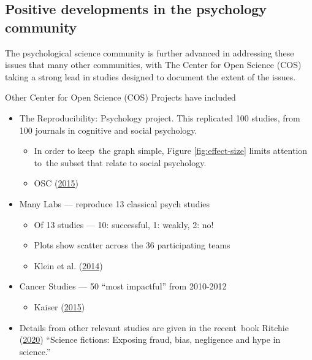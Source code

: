 \documentclass[
  10pt,
  b5paper]{book}
\providecommand{\tightlist}{%
  \setlength{\itemsep}{0pt}\setlength{\parskip}{0pt}}
\begin{document}
\hypertarget{positive-developments-in-the-psychology-community}{%
\subsection*{Positive developments in the psychology community}\label{positive-developments-in-the-psychology-community}}

The psychological science community is further advanced in
addressing these issues that many other communities, with
The Center for Open Science (COS) taking a strong lead in
studies designed to document the extent of the issues.

Other Center for Open Science (COS) Projects have included

\begin{itemize}
\tightlist
\item
  The Reproducibility: Psychology project. This replicated
  100 studies, from 100 journals in cognitive and social
  psychology.

  \begin{itemize}
  \tightlist
  \item
    In order to keep~the graph simple, Figure
    \ref{fig:effect-size} limits attention to~the
    subset that relate to social psychology.
  \item
    OSC (\protect\hyperlink{ref-osc_EstRep2015}{2015})
  \end{itemize}
\item
  Many Labs --- reproduce 13 classical psych studies

  \begin{itemize}
  \tightlist
  \item
    Of 13 studies --- 10: successful, 1: weakly, 2: no!
  \item
    Plots show scatter across the 36 participating teams
  \item
    Klein et al. (\protect\hyperlink{ref-r7_klein_others_2014}{2014})
  \end{itemize}
\item
  Cancer Studies --- 50 ``most impactful'' from 2010-2012

  \begin{itemize}
  \tightlist
  \item
    Kaiser (\protect\hyperlink{ref-r5_kaiser_2015}{2015})
  \end{itemize}
\item
  Details from other relevant studies are given in the
  recent~book Ritchie (\protect\hyperlink{ref-ritchie2020science}{2020}) ``Science fictions: Exposing
  fraud, bias, negligence and hype in science.''
\end{itemize}
\end{document}
